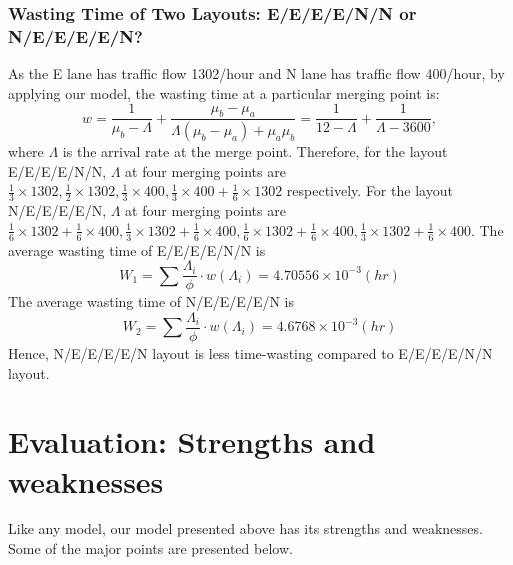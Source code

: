 \subsubsection{Wasting Time of Two Layouts: E/E/E/E/N/N or N/E/E/E/E/N?}
As the E lane has traffic flow 1302/hour and N lane has traffic flow 400/hour, by applying our model, the wasting time at a particular merging point is:
\[
w = \frac{1}{\mu_{b}-\Lambda} + \frac{\mu_{b}-\mu_{a}}{\Lambda(\mu_{b}-\mu_{a}) + \mu_{a}\mu_{b}} = \frac{1}{12-\Lambda} + \frac{1}{\Lambda-3600},
\]
where $\Lambda$ is the arrival rate at the merge point. Therefore, for the layout E/E/E/E/N/N, $\Lambda$ at four merging points are $\frac{1}{3}\times 1302, \frac{1}{2}\times 1302, \frac{1}{3}\times 400, \frac{1}{3}\times 400+\frac{1}{6}\times 1302$ respectively. For the layout N/E/E/E/E/N, $\Lambda$ at four merging points are $\frac{1}{6}\times 1302+\frac{1}{6}\times 400, \frac{1}{3}\times 1302+\frac{1}{6}\times 400, \frac{1}{6}\times 1302+\frac{1}{6}\times 400, \frac{1}{3}\times 1302+\frac{1}{6}\times 400$. The average wasting time of E/E/E/E/N/N is\\
\[
W_{1} = \sum\frac{\Lambda_{i}}{\phi}\cdot w(\Lambda_{i}) = 4.70556\times10^{-3} (hr)
\]
The average wasting time of N/E/E/E/E/N is\\
\[
W_{2} = \sum\frac{\Lambda_{i}}{\phi}\cdot w(\Lambda_{i}) = 4.6768\times10^{-3} (hr)
\]
Hence, N/E/E/E/E/N layout is less time-wasting compared to E/E/E/E/N/N layout.

\section{Evaluation: Strengths and weaknesses}
Like any model, our model presented above has its strengths and weaknesses. Some of the major points are presented below.

